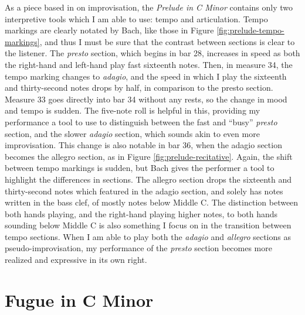 As a piece based in on improvisation, the \textit{Prelude in C Minor} contains only two interpretive tools which I am able to use: tempo and articulation. Tempo markings are clearly notated by Bach, like those in Figure \ref{fig:prelude-tempo-markings}\autocite{Henle_2009}, and thus I must be sure that the contrast between sections is clear to the listener. The \textit{presto} section, which begins in bar 28, increases in speed as both the right-hand and left-hand play fast sixteenth notes. Then, in measure 34, the tempo marking changes to \textit{adagio}, and the speed in which I play the sixteenth and thirty-second notes drops by half, in comparison to the presto section. Measure 33 goes directly into bar 34 without any rests, so the change in mood and tempo is sudden. The five-note roll is helpful in this, providing my performance a tool to use to distinguish between the fast and ``busy'' \textit{presto} section, and the slower \textit{adagio} section, which sounds akin to even more improvisation. This change is also notable in bar 36, when the adagio section becomes the allegro section, as in Figure \ref{fig:prelude-recitative}\autocite{Henle_2009}. Again, the shift between tempo markings is sudden, but Bach gives the performer a tool to highlight the differences in sections. The allegro section drops the sixteenth and thirty-second notes which featured in the adagio section, and solely has notes written in the bass clef, of mostly notes below Middle C. The distinction between both hands playing, and the right-hand playing higher notes, to both hands sounding below Middle C is also something I focus on in the transition between tempo sections. When I am able to play both the \textit{adagio} and \textit{allegro} sections as pseudo-improvisation, my performance of the \textit{presto} section becomes more realized and expressive in its own right. 

\section{Fugue in C Minor}

